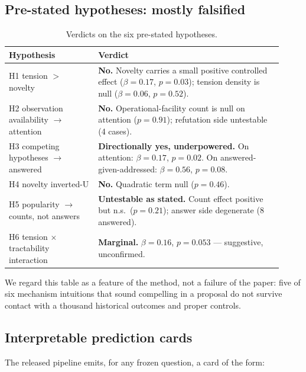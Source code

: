 \documentclass[11pt]{article}
\begin{document}
\subsection{Pre-stated hypotheses: mostly falsified}

\begin{table}[htbp]
  \centering
  \caption{Verdicts on the six pre-stated hypotheses.}
  \label{tab:hypotheses}
  \small
  \begin{tabular}{p{0.30\linewidth}p{0.62\linewidth}}
    \toprule
    Hypothesis & Verdict \\
    \midrule
    H1 tension $>$ novelty &
      \textbf{No.} Novelty carries a small positive controlled effect
      ($\beta=0.17$, $p=0.03$); tension density is null ($\beta=0.06$,
      $p=0.52$). \\
    H2 observation availability $\rightarrow$ attention &
      \textbf{No.} Operational-facility count is null on attention
      ($p=0.91$); refutation side untestable (4 cases). \\
    H3 competing hypotheses $\rightarrow$ answered &
      \textbf{Directionally yes, underpowered.} On attention:
      $\beta=0.17$, $p=0.02$. On answered-given-addressed:
      $\beta=0.56$, $p=0.08$. \\
    H4 novelty inverted-U &
      \textbf{No.} Quadratic term null ($p=0.46$). \\
    H5 popularity $\rightarrow$ counts, not answers &
      \textbf{Untestable as stated.} Count effect positive but n.s.\
      ($p=0.21$); answer side degenerate (8 answered). \\
    H6 tension $\times$ tractability interaction &
      \textbf{Marginal.} $\beta=0.16$, $p=0.053$ --- suggestive,
      unconfirmed. \\
    \bottomrule
  \end{tabular}
\end{table}

We regard this table as a feature of the method, not a failure of the
paper: five of six mechanism intuitions that sound compelling in a
proposal do not survive contact with a thousand historical outcomes and
proper controls.

\subsection{Interpretable prediction cards}

The released pipeline emits, for any frozen question, a card of the form:
\end{document}
